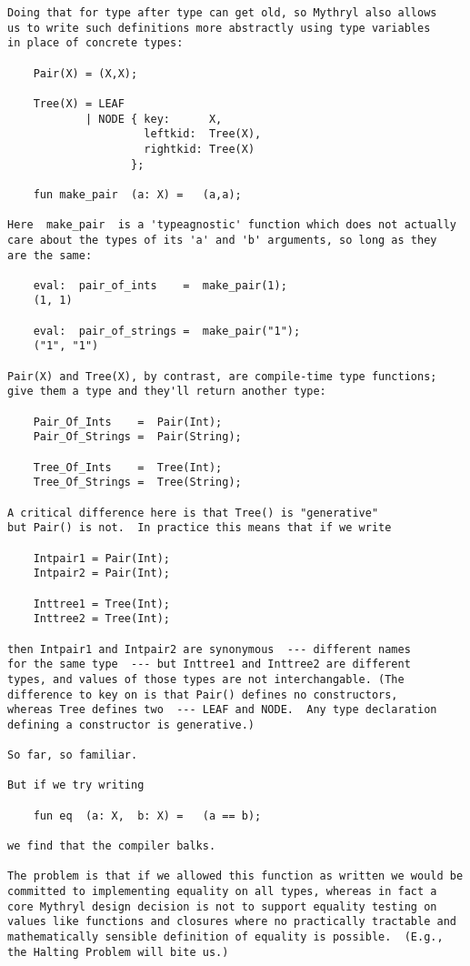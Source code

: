 \begin{verbatim}
Doing that for type after type can get old, so Mythryl also allows 
us to write such definitions more abstractly using type variables 
in place of concrete types: 

    Pair(X) = (X,X); 

    Tree(X) = LEAF 
            | NODE { key:      X, 
                     leftkid:  Tree(X), 
                     rightkid: Tree(X) 
                   }; 

    fun make_pair  (a: X) =   (a,a); 

Here  make_pair  is a 'typeagnostic' function which does not actually 
care about the types of its 'a' and 'b' arguments, so long as they 
are the same: 

    eval:  pair_of_ints    =  make_pair(1);  
    (1, 1) 

    eval:  pair_of_strings =  make_pair("1"); 
    ("1", "1") 

Pair(X) and Tree(X), by contrast, are compile-time type functions; 
give them a type and they'll return another type: 

    Pair_Of_Ints    =  Pair(Int); 
    Pair_Of_Strings =  Pair(String); 

    Tree_Of_Ints    =  Tree(Int); 
    Tree_Of_Strings =  Tree(String); 

A critical difference here is that Tree() is "generative" 
but Pair() is not.  In practice this means that if we write 

    Intpair1 = Pair(Int); 
    Intpair2 = Pair(Int); 

    Inttree1 = Tree(Int); 
    Inttree2 = Tree(Int); 

then Intpair1 and Intpair2 are synonymous  --- different names 
for the same type  --- but Inttree1 and Inttree2 are different 
types, and values of those types are not interchangable. (The 
difference to key on is that Pair() defines no constructors, 
whereas Tree defines two  --- LEAF and NODE.  Any type declaration 
defining a constructor is generative.) 

So far, so familiar. 

But if we try writing 

    fun eq  (a: X,  b: X) =   (a == b); 

we find that the compiler balks. 

The problem is that if we allowed this function as written we would be 
committed to implementing equality on all types, whereas in fact a 
core Mythryl design decision is not to support equality testing on 
values like functions and closures where no practically tractable and 
mathematically sensible definition of equality is possible.  (E.g., 
the Halting Problem will bite us.) 


\end{verbatim}

